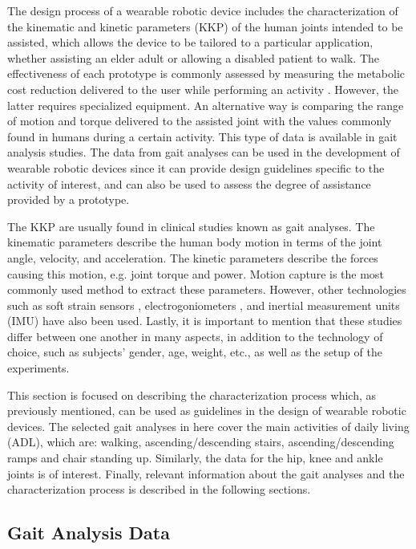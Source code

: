 The design process of a wearable robotic device includes the characterization of the kinematic and kinetic parameters (KKP) of the human joints intended to be assisted, which allows the device to be tailored to a particular application, whether assisting an elder adult or allowing a disabled patient to walk. The effectiveness of each prototype is commonly assessed by measuring the metabolic cost reduction delivered to the user while performing an activity \cite{panizzolo2016biologically}. However, the latter requires specialized equipment. An alternative way is comparing the range of motion and torque delivered to the assisted joint with the values commonly found in humans during a certain activity. This type of data is available in gait analysis studies. The data from gait analyses can be used in the development of wearable robotic devices since it can provide design guidelines specific to the activity of interest, and can also be used to assess the degree of assistance provided by a prototype.

The KKP are usually found in clinical studies known as gait analyses. The kinematic parameters describe the human body motion in terms of the joint angle, velocity, and acceleration. The kinetic
parameters describe the forces causing this motion, e.g. joint torque and power. Motion capture is the most commonly used method to extract these parameters. However, other technologies such as soft strain sensors \cite{mengucc2014wearable}, electrogoniometers \cite{wu2011electromyography}, and inertial measurement units (IMU) have also been used. Lastly, it is important to mention that these studies differ between one another in many aspects, in addition to the technology of choice, such as subjects' gender, age, weight, etc., as well as the setup of the experiments.

This section is focused on describing the characterization process which, as previously mentioned, can be used as guidelines in the design of wearable robotic devices. The selected gait analyses in here cover the main activities of daily living (ADL), which are: walking, ascending/descending stairs, ascending/descending ramps and chair standing up. Similarly, the data for the hip, knee and ankle joints is of interest. Finally, relevant information about the gait analyses and the characterization process is described in the following sections.

\subsection{Gait Analysis Data}

